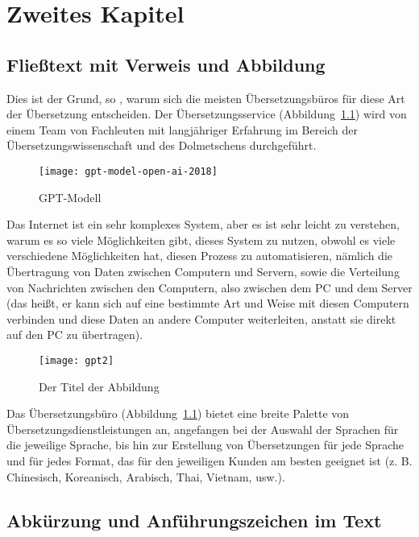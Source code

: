 \chapter{Zweites Kapitel}

\section{Fließtext mit Verweis und Abbildung}

%
%
Dies ist der Grund, so \citet{jurafsky2009}, warum sich die meisten Übersetzungsbüros 
für diese Art der Übersetzung entscheiden.
Der Übersetzungsservice (Abbildung~\ref{fig:bildlabel1}) wird von einem Team von 
Fachleuten \citep[S. 3]{mikolov2013} mit langjähriger Erfahrung im Bereich der 
Übersetzungswissenschaft und des Dolmetschens durchgeführt.

%
%
\begin{figure}[htbp]
\centering
\texttt{[image: gpt-model-open-ai-2018]}
\caption{GPT-Modell} 
\label{fig:bildlabel1}
\end{figure}

Das Internet ist ein sehr komplexes System, aber es ist sehr leicht zu verstehen, warum es so viele Möglichkeiten gibt, dieses System zu nutzen, obwohl es viele verschiedene Möglichkeiten hat, diesen Prozess zu automatisieren, nämlich die Übertragung von Daten zwischen Computern und Servern, sowie die Verteilung von Nachrichten zwischen den Computern, also zwischen dem PC und dem Server (das heißt, er kann sich auf eine bestimmte Art und Weise mit diesen Computern verbinden und diese Daten an andere Computer weiterleiten, anstatt sie direkt auf den PC zu übertragen).

%
%
\begin{figure}[htbp]
\centering
\texttt{[image: gpt2]}
\caption{Der Titel der Abbildung} 
\label{fig:bildlabel2}
\end{figure}

Das Übersetzungsbüro (Abbildung~\ref{fig:bildlabel1}) bietet eine breite Palette von Übersetzungsdienstleistungen an, angefangen bei der Auswahl der Sprachen für die jeweilige Sprache, bis hin zur Erstellung von Übersetzungen für jede Sprache und für jedes Format, das für den jeweiligen Kunden am besten geeignet ist (z. B. Chinesisch, Koreanisch, Arabisch, Thai, Vietnam, usw.).

\section{Abkürzung und Anführungszeichen im Text}

